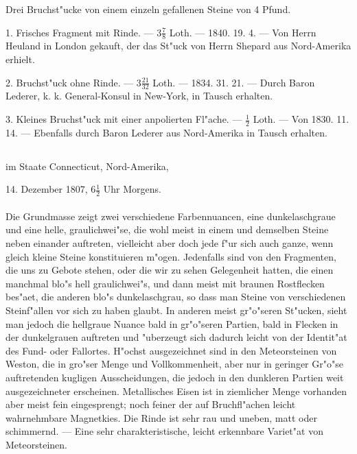 \documentclass[a4paper, 11pt, oneside, polutonikogreek, german]{article}
\begin{document}
Drei Bruchst"ucke von einem einzeln gefallenen Steine von 4 Pfund.

1. Frisches Fragment mit Rinde. --- $\mathfrak{3\frac{7}{8}}$ Loth. --- 1840. 19. 4. --- Von Herrn Heuland in London gekauft, der das St"uck von Herrn Shepard aus Nord-Amerika erhielt.

2. Bruchst"uck ohne Rinde. --- $\mathfrak{3\frac{21}{32}}$ Loth. --- 1834. 31. 21. --- Durch Baron Lederer, k. k. General-Konsul in New-York, in Tausch erhalten.

3. Kleines Bruchst"uck mit einer anpolierten Fl"ache. --- $\mathfrak{\frac{1}{2}}$ Loth. --- Von 1830. 11. 14. --- Ebenfalls durch Baron Lederer aus Nord-Amerika in Tausch erhalten.
\subsection[\swabfamily {Weston.}]{}
\begin{center}

im Staate Connecticut, Nord-Amerika,

14. Dezember 1807, $\mathfrak{6\frac{1}{2}}$ Uhr Morgens.
\end{center}
\paragraph{}
Die Grundmasse zeigt zwei verschiedene Farbennuancen, eine dunkelaschgraue und eine helle, graulichwei"se, die wohl meist in einem und demselben Steine neben einander auftreten, vielleicht aber doch jede f"ur sich auch ganze, wenn gleich kleine Steine konstituieren m"ogen. Jedenfalls sind von den Fragmenten, die uns zu Gebote stehen, oder die wir zu sehen Gelegenheit hatten, die einen manchmal blo"s hell graulichwei"s, und dann meist mit braunen Rostflecken bes"aet, die anderen blo"s dunkelaschgrau, so dass man Steine von verschiedenen Steinf"allen vor sich zu haben glaubt. In anderen meist gr"o"seren St"ucken, sieht man jedoch die hellgraue Nuance bald in gr"o"seren Partien, bald in Flecken in der dunkelgrauen auftreten und "uberzeugt sich dadurch leicht von der Identit"at des Fund- oder Fallortes. H"ochst ausgezeichnet sind in den Meteorsteinen von Weston, die in gro"ser Menge und Vollkommenheit, aber nur in geringer Gr"o"se auftretenden kugligen Ausscheidungen, die jedoch in den dunkleren Partien weit ausgezeichneter erscheinen. Metallisches Eisen ist in ziemlicher Menge vorhanden aber meist fein eingesprengt; noch feiner der auf Bruchfl"achen leicht wahrnehmbare Magnetkies. Die Rinde ist sehr rau und uneben, matt oder schimmernd. --- Eine sehr charakteristische, leicht erkennbare Variet"at von Meteorsteinen.
\end{document}
